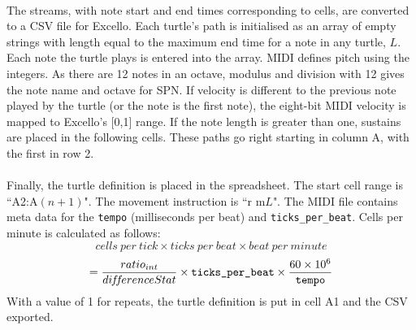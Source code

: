 \paragraph{} The streams, with note start and end times corresponding to cells, are converted to a CSV file for Excello. Each turtle's path is initialised as an array of empty strings with length equal to the maximum end time for a note in any turtle, $L$.  Each note the turtle plays is entered into the array. MIDI defines pitch using the integers. As there are 12 notes in an octave, modulus and division with 12 gives the note name and octave for SPN. If velocity is different to the previous note played by the turtle (or the note is the first note), the eight-bit MIDI velocity is mapped to Excello's [0,1] range. If the note length is greater than one, sustains are placed in the following cells. These paths go right starting in column A, with the first in row 2.

\paragraph{} Finally, the turtle definition is placed in the spreadsheet. The start cell range is ``A2:A$(n+1)$". The movement instruction is ``r m$L$". The MIDI file contains meta data for the \texttt{tempo} (milliseconds per beat) and \texttt{ticks\_per\_beat}. Cells per minute is calculated as follows:
  $$cells\ per\ tick \times ticks\ per\ beat \times beat\ per\ minute$$
  $$= \frac{ratio_{int}}{di\hspace{-0.1em}f\hspace{-0.2em}f\hspace{-0.1em}erenceStat} \times \texttt{ticks\_per\_beat} \times \frac{60 \times 10^6}{\texttt{tempo}}$$
With a value of 1 for repeats, the turtle definition is put in cell A1 and the CSV exported.


